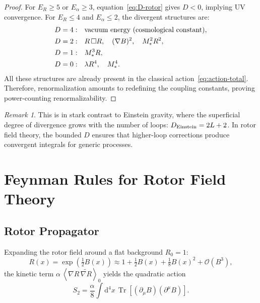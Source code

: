 \documentclass[11pt,a4paper]{article}
\numberwithin{equation}{section}
\theoremstyle{plain}
\theoremstyle{definition}
\theoremstyle{remark}
\newtheorem{remark}[theorem]{Remark}
\DeclareMathOperator{\Tr}{Tr}
\newcommand{\dd}{\mathrm{d}}
\newcommand{\rev}[1]{\widetilde{#1}}        %
\newcommand{\grade}[2]{\left\langle #1 \right\rangle_{#2}}
\begin{document}
\begin{proof}
For $E_R\geq 5$ or $E_\alpha\geq 3$, equation~\eqref{eq:D-rotor} gives $D<0$, implying UV convergence. For $E_R\leq 4$ and $E_\alpha\leq 2$, the divergent structures are:
\begin{align}
D=4: &\quad \text{vacuum energy (cosmological constant)}, \notag\\
D=2: &\quad R\,\Box R,\quad (\nabla B)^2,\quad M_*^2 R^2, \notag\\
D=1: &\quad M_*^3 R, \notag\\
D=0: &\quad \lambda R^4,\quad M_*^4. \notag
\end{align}
All these structures are already present in the classical action~\eqref{eq:action-total}. Therefore, renormalization amounts to redefining the coupling constants, proving power-counting renormalizability.
\end{proof}

\begin{remark}
This is in stark contrast to Einstein gravity, where the superficial degree of divergence grows with the number of loops: $D_{\rm Einstein}=2L+2$. In rotor field theory, the bounded $D$ ensures that higher-loop corrections produce convergent integrals for generic processes.
\end{remark}

\vspace{1em}

\section{Feynman Rules for Rotor Field Theory}\label{sec:feynman}

\subsection{Rotor Propagator}

Expanding the rotor field around a flat background $R_0=1$:
\begin{equation}
R(x) = \exp\left(\tfrac12 B(x)\right) \approx 1 + \tfrac12 B(x) + \tfrac18 B(x)^2 + \mathcal{O}(B^3),
\label{eq:R-expansion}
\end{equation}
the kinetic term $\alpha\,\grade{\nabla R\,\rev{\nabla R}}{0}$ yields the quadratic action
\begin{equation}
S_2 = \frac{\alpha}{8}\int \dd^4x\,\Tr[(\partial_\mu B)(\partial^\mu B)].
\label{eq:S2-rotor}
\end{equation}
\end{document}
